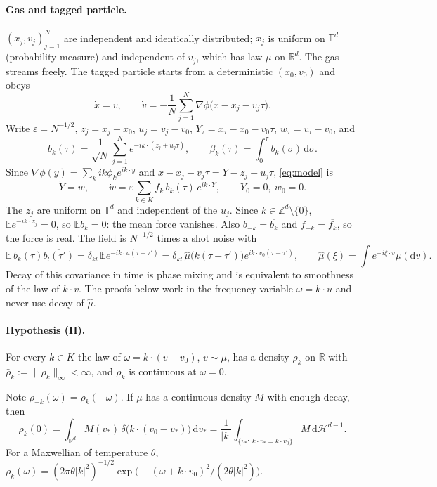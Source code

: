 \documentclass[11pt]{article}
\newcommand{\dd}{\mathrm{d}}
\newcommand{\E}{\mathbb{E}}
\newcommand{\eps}{\varepsilon}
\newcommand{\T}{\mathbb{T}}
\newcommand{\R}{\mathbb{R}}
\newcommand{\Z}{\mathbb{Z}}
\newcommand{\bbar}{\bar\rho}
\newcommand{\nrm}[1]{\|#1\|_\infty}
\theoremstyle{remark}
\begin{document}
\paragraph{Gas and tagged particle.} $(x_j,v_j)_{j=1}^N$ are independent and
identically distributed; $x_j$ is uniform on $\T^d$ (probability measure) and
independent of $v_j$, which has law $\mu$ on $\R^d$. The gas streams freely.
The tagged particle starts from a deterministic $(x_0,v_0)$ and obeys
\begin{equation}
  \dot x=v,\qquad
  \dot v=-\frac1N\sum_{j=1}^N\nabla\phi\bigl(x-x_j-v_j\tau\bigr).
  \label{eq:model}
\end{equation}
Write $\eps=N^{-1/2}$, $z_j=x_j-x_0$, $u_j=v_j-v_0$,
$Y_\tau=x_\tau-x_0-v_0\tau$, $w_\tau=v_\tau-v_0$, and
\[
  b_k(\tau)=\frac1{\sqrt N}\sum_{j=1}^Ne^{-ik\cdot(z_j+u_j\tau)},\qquad
  \beta_k(\tau)=\int_0^\tau b_k(\sigma)\,\dd\sigma .
\]
Since $\nabla\phi(y)=\sum_kik\phi_ke^{ik\cdot y}$ and
$x-x_j-v_j\tau=Y-z_j-u_j\tau$, \eqref{eq:model} is
\begin{equation}
  \dot Y=w,\qquad \dot w=\eps\sum_{k\in K}f_k\,b_k(\tau)\,e^{ik\cdot Y},
  \qquad Y_0=0,\ w_0=0 .
  \label{eq:Yw}
\end{equation}
The $z_j$ are uniform on $\T^d$ and independent of the $u_j$. Since
$k\in\Z^d\setminus\{0\}$, $\E e^{-ik\cdot z_j}=0$, so $\E b_k=0$: the mean
force vanishes. Also $b_{-k}=\overline{b_k}$ and $f_{-k}=\overline{f_k}$, so
the force is real. The field is $N^{-1/2}$ times a shot noise with
\[
  \E\,b_k(\tau)\overline{b_l(\tau')}
  =\delta_{kl}\,\E e^{-ik\cdot u(\tau-\tau')}
  =\delta_{kl}\,\hat\mu\bigl(k(\tau-\tau')\bigr)e^{ik\cdot v_0(\tau-\tau')},
  \qquad \hat\mu(\xi)=\int e^{-i\xi\cdot v}\mu(\dd v).
\]
Decay of this covariance in time is phase mixing and is equivalent to
smoothness of the law of $k\cdot v$. The proofs below work in the frequency
variable $\omega=k\cdot u$ and never use decay of $\hat\mu$.

\paragraph{Hypothesis (H).} For every $k\in K$ the law of
$\omega=k\cdot(v-v_0)$, $v\sim\mu$, has a density $\rho_k$ on $\R$ with
$\bbar_k:=\nrm{\rho_k}<\infty$, and $\rho_k$ is continuous at $\omega=0$.

Note $\rho_{-k}(\omega)=\rho_k(-\omega)$. If $\mu$ has a continuous density
$M$ with enough decay, then
\[
  \rho_k(0)=\int_{\R^d}M(v_*)\,\delta\bigl(k\cdot(v_0-v_*)\bigr)\,\dd v_*
  =\frac1{|k|}\int_{\{v_*:\ k\cdot v_*=k\cdot v_0\}}M\,\dd\mathcal{H}^{d-1}.
\]
For a Maxwellian of temperature $\theta$,
$\rho_k(\omega)=(2\pi\theta|k|^2)^{-1/2}
\exp\bigl(-(\omega+k\cdot v_0)^2/(2\theta|k|^2)\bigr)$.
\end{document}
